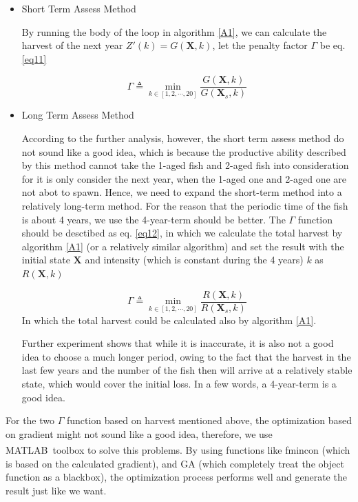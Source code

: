 \documentclass{IEEEtran}
\begin{document}
\begin{itemize}
    \item {Short Term Assess Method

    By running the body of the loop in algorithm \ref{A1}, we can calculate the harvest of the next year $Z'(k) = G(\bm X,k)$, let the penalty factor $\Gamma$ be eq. \ref{eq11}
    
    \begin{equation}
        \label{eq11}
        \Gamma \triangleq \min_{k \in[1,2,\cdots,20]} \frac{G(\bm X,k)}{G(\bm X_s,k)}
    \end{equation}
    }

    \item {Long Term Assess Method
        
    According to the further analysis, however, the short term assess method do not sound like a good idea, which is because the productive ability described by this method cannot take the 1-aged fish and 2-aged fish into consideration for it is only consider the next year, when the 1-aged one and 2-aged one are not abot to spawn. Hence, we need to expand the short-term method into a relatively long-term method. For the reason that the periodic time of the fish is about 4 years, we use the 4-year-term should be better. The $\Gamma$ function should be desctibed as eq. \ref{eq12}, in which we calculate the total harvest by algorithm \ref{A1} (or a relatively similar algorithm) and set the result with the initial state $\bm X$ and intensity (which is constant during the 4 years) $k$ as $R(\bm X,k)$
    
    \begin{equation}
        \label{eq12}
        \Gamma \triangleq \min_{k \in[1,2,\cdots,20]} \frac{R(\bm X,k)}{R(\bm X_s,k)}
    \end{equation}
    In which the total harvest could be calculated also by algorithm \ref{A1}.

    Further experiment shows that while it is inaccurate, it is also not a good idea to choose a much longer period, owing to the fact that the harvest in the last few years and the number of the fish then will arrive at a relatively stable state, which would cover the initial loss. In a few words, a 4-year-term is a good idea.
        }
\end{itemize}

For the two $\Gamma$ function based on harvest mentioned above, the optimization based on gradient might not sound like a good idea, therefore, we use MATLAB\textsuperscript\textregistered \ toolbox\textsuperscript{\cite{MATLABOptimizationToolbox}} to solve this problems. By using functions like fmincon (which is based on the calculated gradient), and GA (which completely treat the object function as a blackbox), the optimization process performs well and generate the result just like we want.
\end{document}
